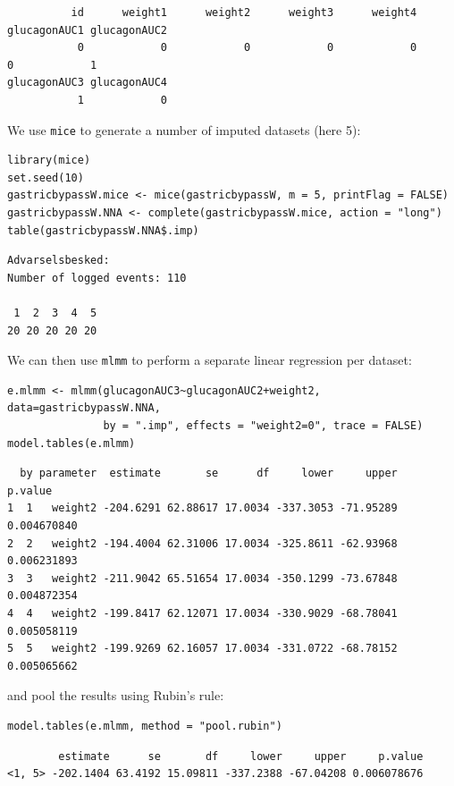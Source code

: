 \documentclass[12pt]{article}
\begin{document}
\begin{verbatim}
          id      weight1      weight2      weight3      weight4 glucagonAUC1 glucagonAUC2 
           0            0            0            0            0            0            1 
glucagonAUC3 glucagonAUC4 
           1            0
\end{verbatim}


We use \texttt{mice} to generate a number of imputed datasets (here 5):
\lstset{language=r,label= ,caption= ,captionpos=b,numbers=none}
\begin{lstlisting}
library(mice)
set.seed(10)
gastricbypassW.mice <- mice(gastricbypassW, m = 5, printFlag = FALSE)
gastricbypassW.NNA <- complete(gastricbypassW.mice, action = "long")
table(gastricbypassW.NNA$.imp)
\end{lstlisting}

\begin{verbatim}
Advarselsbesked:
Number of logged events: 110

 1  2  3  4  5 
20 20 20 20 20
\end{verbatim}


We can then use \texttt{mlmm} to perform a separate linear regression per dataset:
\lstset{language=r,label= ,caption= ,captionpos=b,numbers=none}
\begin{lstlisting}
e.mlmm <- mlmm(glucagonAUC3~glucagonAUC2+weight2, data=gastricbypassW.NNA,
               by = ".imp", effects = "weight2=0", trace = FALSE)
model.tables(e.mlmm)
\end{lstlisting}

\begin{verbatim}
  by parameter  estimate       se      df     lower     upper     p.value
1  1   weight2 -204.6291 62.88617 17.0034 -337.3053 -71.95289 0.004670840
2  2   weight2 -194.4004 62.31006 17.0034 -325.8611 -62.93968 0.006231893
3  3   weight2 -211.9042 65.51654 17.0034 -350.1299 -73.67848 0.004872354
4  4   weight2 -199.8417 62.12071 17.0034 -330.9029 -68.78041 0.005058119
5  5   weight2 -199.9269 62.16057 17.0034 -331.0722 -68.78152 0.005065662
\end{verbatim}


and pool the results using Rubin's rule:
\lstset{language=r,label= ,caption= ,captionpos=b,numbers=none}
\begin{lstlisting}
model.tables(e.mlmm, method = "pool.rubin")
\end{lstlisting}

\begin{verbatim}
        estimate      se       df     lower     upper     p.value
<1, 5> -202.1404 63.4192 15.09811 -337.2388 -67.04208 0.006078676
\end{verbatim}
\end{document}
